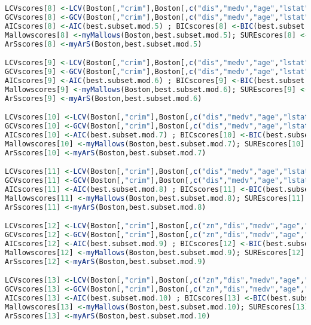 \documentclass[11pt]{report}
\begin{document}
\begin{itemize}
\begin{lstlisting}[language=R]
LCVscores[8] <-LCV(Boston[,"crim"],Boston[,c("dis","medv","age","lstat","ptratio")])
GCVscores[8] <-GCV(Boston[,"crim"],Boston[,c("dis","medv","age","lstat","ptratio")])
AICscores[8] <-AIC(best.subset.mod.5) ; BICscores[8] <-BIC(best.subset.mod.5) ; 
Mallowscores[8] <-myMallows(Boston,best.subset.mod.5); SUREscores[8] <-mySURE(best.subset.mod.5)
ArSscores[8] <-myArS(Boston,best.subset.mod.5)

LCVscores[9] <-LCV(Boston[,"crim"],Boston[,c("dis","medv","age","lstat","ptratio","chas")])
GCVscores[9] <-GCV(Boston[,"crim"],Boston[,c("dis","medv","age","lstat","ptratio","chas")])
AICscores[9] <-AIC(best.subset.mod.6) ; BICscores[9] <-BIC(best.subset.mod.6) ; 
Mallowscores[9] <-myMallows(Boston,best.subset.mod.6); SUREscores[9] <-mySURE(best.subset.mod.6)
ArSscores[9] <-myArS(Boston,best.subset.mod.6)

LCVscores[10] <-LCV(Boston[,"crim"],Boston[,c("dis","medv","age","lstat","ptratio","chas","tax")])
GCVscores[10] <-GCV(Boston[,"crim"],Boston[,c("dis","medv","age","lstat","ptratio","chas","tax")])
AICscores[10] <-AIC(best.subset.mod.7) ; BICscores[10] <-BIC(best.subset.mod.7) ; 
Mallowscores[10] <-myMallows(Boston,best.subset.mod.7); SUREscores[10] <-mySURE(best.subset.mod.7)
ArSscores[10] <-myArS(Boston,best.subset.mod.7)

LCVscores[11] <-LCV(Boston[,"crim"],Boston[,c("dis","medv","age","lstat","ptratio","chas","tax","black")])
GCVscores[11] <-GCV(Boston[,"crim"],Boston[,c("dis","medv","age","lstat","ptratio","chas","tax","black")])
AICscores[11] <-AIC(best.subset.mod.8) ; BICscores[11] <-BIC(best.subset.mod.8) ; 
Mallowscores[11] <-myMallows(Boston,best.subset.mod.8); SUREscores[11] <-mySURE(best.subset.mod.8)
ArSscores[11] <-myArS(Boston,best.subset.mod.8)

LCVscores[12] <-LCV(Boston[,"crim"],Boston[,c("zn","dis","medv","age","lstat","ptratio","chas","tax","black")])
GCVscores[12] <-GCV(Boston[,"crim"],Boston[,c("zn","dis","medv","age","lstat","ptratio","chas","tax","black")])
AICscores[12] <-AIC(best.subset.mod.9) ; BICscores[12] <-BIC(best.subset.mod.9) ; 
Mallowscores[12] <-myMallows(Boston,best.subset.mod.9); SUREscores[12] <-mySURE(best.subset.mod.9)
ArSscores[12] <-myArS(Boston,best.subset.mod.9)

LCVscores[13] <-LCV(Boston[,"crim"],Boston[,c("zn","dis","medv","age","lstat","ptratio","chas","tax","black","nox")])
GCVscores[13] <-GCV(Boston[,"crim"],Boston[,c("zn","dis","medv","age","lstat","ptratio","chas","tax","black","nox")])
AICscores[13] <-AIC(best.subset.mod.10) ; BICscores[13] <-BIC(best.subset.mod.10) ; 
Mallowscores[13] <-myMallows(Boston,best.subset.mod.10); SUREscores[13] <-mySURE(best.subset.mod.10)
ArSscores[13] <-myArS(Boston,best.subset.mod.10)


\end{lstlisting}
\end{itemize}
\end{document}
